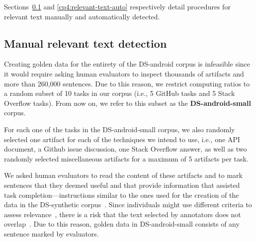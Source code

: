 Sections~\ref{cp4:relevant-text-manual} and \ref{cp4:relevant-text-auto} respectively detail procedures for 
relevant text manually and automatically detected.





\subsection{Manual relevant text detection}
\label{cp4:relevant-text-manual}



Creating golden data for the entirety of the \acs{DS-android} corpus is infeasible
since it would require asking human evaluators to inspect thousands of artifacts and more than 260,000 sentences.
Due to this reason, we restrict computing ratios to a random subset of 10 tasks in our corpus (i.e., 5 GitHub tasks and 5 Stack Overflow tasks). 
From now on, we refer to this subset as the \textbf{\acs{DS-android-small}} corpus.


For each one of the tasks in the \acs{DS-android-small} corpus, we also randomly selected 
one artifact for each of the techniques we intend to use, i.e., one API document, a Github issue discussion, one Stack Overflow answer, as well as two randomly selected miscellaneous artifacts for a maximum of 5 artifacts per task.




We asked human evaluators to read the content of these
artifacts and 
to mark sentences that they deemed useful and that provide information that assisted task completion---instructions similar to the ones used for the creation of the 
data in the \acs{DS-synthetic} corpus~\cite{marques2020}.
Since individuals might use different criteria to
assess relevance~\cite{Barry1994, Barry1998, Freund2015},
there is a risk that
the text selected by annotators does not overlap~\cite{Freund2013, Freund2015}.
Due to this reason, golden data in \acs{DS-android-small} consists of any sentence marked by evaluators. 


